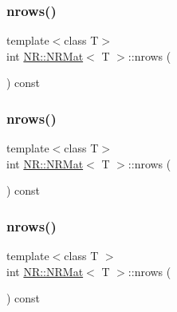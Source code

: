 \mbox{\label{classNR_1_1NRMat_aacebd802ca3dea0e0079a8dd27f7102c}} 
\subsubsection{\texorpdfstring{nrows()}{nrows()}\hspace{0.1cm}{\footnotesize\ttfamily [1/3]}}
{\footnotesize\ttfamily template$<$class T$>$ \\
int \mbox{\hyperlink{classNR_1_1NRMat}{N\+R\+::\+N\+R\+Mat}}$<$ T $>$\+::nrows (\begin{DoxyParamCaption}{ }\end{DoxyParamCaption}) const\hspace{0.3cm}{\ttfamily [inline]}}

\mbox{\label{classNR_1_1NRMat_aacebd802ca3dea0e0079a8dd27f7102c}} 
\subsubsection{\texorpdfstring{nrows()}{nrows()}\hspace{0.1cm}{\footnotesize\ttfamily [2/3]}}
{\footnotesize\ttfamily template$<$class T$>$ \\
int \mbox{\hyperlink{classNR_1_1NRMat}{N\+R\+::\+N\+R\+Mat}}$<$ T $>$\+::nrows (\begin{DoxyParamCaption}{ }\end{DoxyParamCaption}) const\hspace{0.3cm}{\ttfamily [inline]}}

\mbox{\label{classNR_1_1NRMat_aacebd802ca3dea0e0079a8dd27f7102c}} 
\subsubsection{\texorpdfstring{nrows()}{nrows()}\hspace{0.1cm}{\footnotesize\ttfamily [3/3]}}
{\footnotesize\ttfamily template$<$class T $>$ \\
int \mbox{\hyperlink{classNR_1_1NRMat}{N\+R\+::\+N\+R\+Mat}}$<$ T $>$\+::nrows (\begin{DoxyParamCaption}{ }\end{DoxyParamCaption}) const\hspace{0.3cm}{\ttfamily [inline]}}


